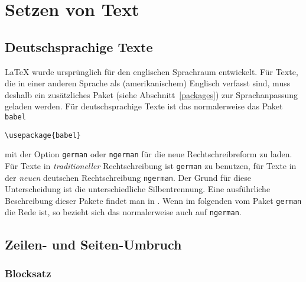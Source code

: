  
\section{Setzen von Text}
 

\subsection{Deutschsprachige Texte}\label{deutsch}
\LaTeX{} wurde ursprünglich für den englischen Sprachraum entwickelt.
Für Texte, die in einer anderen Sprache als (amerikanischem)
Englisch verfasst sind, muss deshalb ein zusätzliches Paket 
(siehe Abschnitt~\ref{packages}) zur Sprachanpassung geladen werden.  
Für deutschsprachige Texte ist das normalerweise das Paket \texttt{babel} 
\begin{beispiel}
\verb:\usepackage{babel}:
\end{beispiel}
mit der Option \texttt{german} oder \texttt{ngerman} für die neue
Rechtschreibreform zu laden. 
Für Texte in \emph{traditioneller} Rechtschreibung ist \texttt{german}
zu benutzen, für Texte in der \emph{neuen} deutschen Rechtschreibung
\texttt{ngerman}.
Der Grund für diese Unterscheidung ist die unterschiedliche Silbentrennung.
Eine ausführliche Beschreibung dieser Pakete findet man in \cite{germdoc}.  
Wenn im folgenden vom Paket \texttt{german} die Rede ist, 
so bezieht sich das normalerweise auch auf \texttt{ngerman}.


\subsection{Zeilen- und Seiten-Umbruch}

\subsubsection{Blocksatz}

